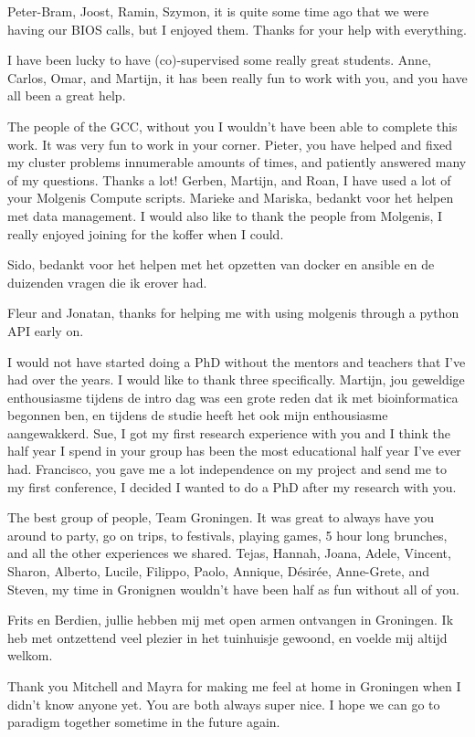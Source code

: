 \begin{appendices}
Peter-Bram, Joost, Ramin, Szymon, it is quite some time ago that we were having our BIOS calls, but I enjoyed them. Thanks for your help with everything.

I have been lucky to have (co)-supervised some really great students. Anne, Carlos, Omar, and Martijn, it has been really fun to work with you, and you have all been a great help. 

The people of the GCC, without you I wouldn't have been able to complete this work. It was very fun to work in your corner. Pieter, you have helped and fixed my cluster problems innumerable amounts of times, and patiently answered many of my questions. Thanks a lot! Gerben, Martijn, and Roan, I have used a lot of your Molgenis Compute scripts. Marieke and Mariska, bedankt voor het helpen met data management. I would also like to thank the people from Molgenis, I really enjoyed joining for the koffer when I could. 

Sido, bedankt voor het helpen met het opzetten van docker en ansible en de duizenden vragen die ik erover had. 

Fleur and Jonatan, thanks for helping me with using molgenis through a python API early on. 

I would not have started doing a PhD without the mentors and teachers that I've had over the years. I would like to thank three specifically. Martijn, jou geweldige enthousiasme tijdens de intro dag was een grote reden dat ik met bioinformatica begonnen ben, en tijdens de studie heeft het ook mijn enthousiasme aangewakkerd. Sue, I got my first research experience with you and I think the half year I spend in your group has been the most educational half year I've ever had. Francisco, you gave me a lot independence on my project and send me to my first conference, I decided I wanted to do a PhD after my research with you.

The best group of people, Team Groningen. It was great to always have you around to party, go on trips, to festivals, playing games, 5 hour long brunches, and all the other experiences we shared. Tejas, Hannah, Joana, Adele, Vincent, Sharon, Alberto, Lucile, Filippo, Paolo, Annique, D\'esir\'ee, Anne-Grete, and Steven, my time in Gronignen wouldn't have been half as fun without all of you. 

Frits en Berdien, jullie hebben mij met open armen ontvangen in Groningen. Ik heb met ontzettend veel plezier in het tuinhuisje gewoond, en voelde mij altijd welkom.

Thank you Mitchell and Mayra for making me feel at home in Groningen when I didn't know anyone yet. You are both always super nice. I hope we can go to paradigm together sometime in the future again.


\end{appendices}
